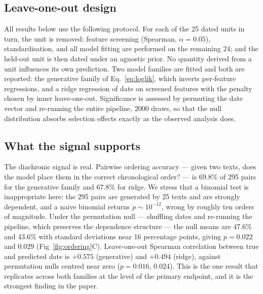 \documentclass[10pt,letterpaper]{article}
\begin{document}
\subsection*{Leave-one-out design}

All results below use the following protocol.  For each of the 25 dated
units in turn, the unit is removed; feature screening (Spearman, $\alpha =
0.05$), standardisation, and all model fitting are performed on the
remaining 24; and the held-out unit is then dated under an agnostic prior.
No quantity derived from a unit influences its own prediction.  Two model
families are fitted and both are reported: the generative family of
Eq.~\ref{eq:loglik}, which inverts per-feature regressions, and a ridge
regression of date on screened features with the penalty chosen by inner
leave-one-out.  Significance is assessed by permuting the date vector and
re-running the entire pipeline, 2000 draws, so that the null distribution
absorbs selection effects exactly as the observed analysis does.

\subsection*{What the signal supports}

The diachronic signal is real.  Pairwise ordering accuracy --- given two
texts, does the model place them in the correct chronological order? --- is
69.8\% of 295 pairs for the generative family and 67.8\% for ridge.  We
stress that a binomial test is inappropriate here: the 295 pairs are
generated by 25 texts and are strongly dependent, and a naive binomial
returns $p \sim 10^{-12}$, wrong by roughly ten orders of magnitude.
Under the permutation null --- shuffling dates and re-running the
pipeline, which preserves the dependence structure --- the null means are
47.6\% and 43.6\% with standard deviations near 16 percentage points,
giving $p = 0.022$ and $0.029$ (Fig~\ref{fig:ordering}C).  Leave-one-out Spearman correlation between true and predicted
date is $+0.575$ (generative) and $+0.494$ (ridge), against permutation
nulls centred near zero ($p = 0.016$, $0.024$).  This is the one result
that replicates across both families at the level of the primary endpoint,
and it is the strongest finding in the paper.
\end{document}
